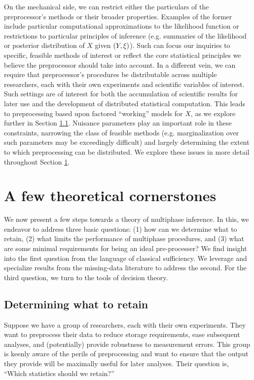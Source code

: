 On the mechanical side, we can restrict either the particulars of the preprocessor's methods or their broader properties.
Examples of the former include particular computational approximations to the likelihood function or restrictions to particular principles of inference (e.g. summaries of the likelihood or posterior distribution of $X$ given $(Y, \xi)$).
Such can focus our inquiries to specific, feasible methods of interest or reflect the core statistical principles we believe the preprocessor should take into account.
In a different vein, we can require that preprocessor's procedures be distributable across multiple researchers, each with their own experiments and scientific variables of interest.
Such settings are of interest for both the accumulation of scientific results for later use and the development of distributed statistical computation.
This leads to preprocessing based upon factored ``working'' models for $X$, as we explore further in Section \ref{multiphase:sec:sufficiency}.
Nuisance parameters play an important role in these constraints, narrowing the class of feasible methods (e.g. marginalization over such parameters may be exceedingly difficult) and largely determining the extent to which preprocessing can be distributed.
We explore these issues in more detail throughout Section \ref{multiphase:sec:theory}.

\section{A few theoretical cornerstones}
\label{multiphase:sec:theory}

We now present a few steps towards a theory of multiphase inference.
In this, we endeavor to address three basic questions: (1) how can we determine what to retain, (2) what limits the performance of multiphase procedures, and (3) what are some minimal requirements for being an ideal pre-processer?
We find insight into the first question from the language of classical sufficiency.
We leverage and specialize results from the missing-data literature  to address the second.
For the third question, we turn to the tools of decision theory.

\subsection{Determining what to retain}
\label{multiphase:sec:sufficiency}

Suppose we have a group of researchers, each with their own experiments.
They want to preprocess their data to reduce storage requirements, ease subsequent analyses, and (potentially) provide robustness to measurement errors.
This group is keenly aware of the perils of preprocessing and want to ensure that the output they provide will be maximally useful for later analyses.
Their question is, ``Which statistics should we retain?''

